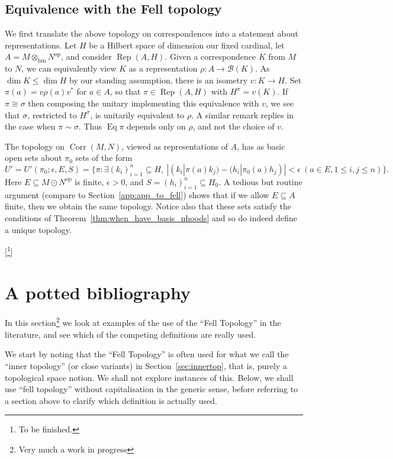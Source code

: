 \documentclass[a4paper,11pt]{article}
\newcommand{\mc}[1]{{\mathcal{#1}}}
\newcommand{\Rep}{\operatorname{Rep}}
\newcommand{\Eq}{\operatorname{Eq}}
\newcommand{\op}{{\operatorname{op}}}
\newcommand{\bin}{{\operatorname{bin}}}
\newcommand{\Corr}{{\operatorname{Corr}}}
\begin{document}
\subsection{Equivalence with the Fell topology}

We first translate the above topology on correspondences into a statement about
representations.  Let $H$ be a Hilbert space of dimension our fixed cardinal,
let $A = M \otimes_{\bin} N^\op$, and consider $\Rep(A,H)$.  Given a
correspondence $K$ from $M$ to $N$, we can equivalently view $K$ as a
representation $\rho : A\rightarrow\mc B(K)$.  As $\dim K\leq \dim H$ by our
standing assumption, there is an isometry $v:K\rightarrow H$.  Set $\pi(a)
= v\rho(a)v^*$ for $a\in A$, so that $\pi\in\Rep(A,H)$ with $H^\pi = v(K)$.
If $\pi\cong\sigma$ then composing the unitary implementing this equivalence
with $v$, we see that $\sigma$, restricted to $H^\sigma$, is unitarily
equivalent to $\rho$.  A similar remark replies in the case when $\pi\sim\sigma$.
Thus $\Eq\pi$ depends only on $\rho$, and not the choice of $v$.

The topology on $\Corr(M,N)$, viewed as representations of $A$, has as basic
open sets about $\pi_0$ sets of the form
\[ U' = U'(\pi_0; \epsilon, E, S)
= \big\{ \pi : \exists (k_i)_{i=1}^n\subseteq H, \ 
|(k_i|\pi(a)k_j) - (h_i|\pi_0(a)h_j)|<\epsilon \ 
(a\in E, 1\leq i,j\leq n)
\big\}. \]
Here $E\subseteq M\odot N^\op$ is finite, $\epsilon>0$, and
$S=(h_i)_{i=1}^n \subseteq H_0$.  A tedious but routine argument
(compare to Section~\ref{app:app_to_fell}) shows that if
we allow $E\subseteq A$ finite, then we obtain the same topology.
Notice also that these sets satisfy the conditions of 
Theorem~\ref{thm:when_have_basis_nhoods} and so do indeed define a unique
topology.

[\footnote{To be finished.}]




\section{A potted bibliography}

In this section\footnote{Very much a work in progress} we look at examples of
the use of the ``Fell Topology'' in the literature, and see which of the
competing definitions are really used.

We start by noting that the ``Fell Topology'' is often used for what we call the
``inner topology'' (or close variants) in Section~\ref{sec:innertop}, that is,
purely a topological space notion.  We shall not explore instances of this.
Below, we shall use ``fell topology'' without capitalisation in the generic
sense, before referring to a section above to clarify which definition is
actually used.
\end{document}
